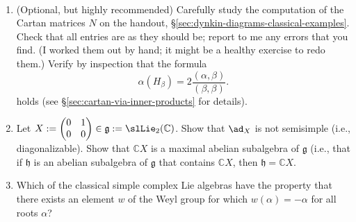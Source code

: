 \documentclass[reqno]{amsart} 
\begin{document}
\begin{homework}
~
  \begin{enumerate}
  \item
    (Optional, but highly recommended)
    Carefully study the computation of the Cartan
    matrices $N$ on the handout, \S\ref{sec:dynkin-diagrams-classical-examples}.
    Check that all entries are as they should be;
    report to me any errors that you find.
    (I worked them out by hand; it might be a healthy exercise
    to redo them.)
    Verify by inspection that the formula
    \begin{equation*}
    \alpha(H_\beta)
    = 2 \frac{(\alpha,\beta)}{(\beta,\beta)}.
    \end{equation*}
    holds (see \S\ref{sec:cartan-via-inner-products} for
    details).

  \item
    Let $X := 
\begin{pmatrix}
      0 & 1 \\
      0 & 0
    \end{pmatrix}
 \in \mathfrak{g} := \slLie_2(\mathbb{C})$.
    Show that $\ad_X$ is not semisimple (i.e., diagonalizable).
    Show that $\mathbb{C} X$ is a maximal abelian subalgebra
    of $\mathfrak{g}$ (i.e., that if $\mathfrak{h}$ is
    an abelian subalgebra of $\mathfrak{g}$ that contains
    $\mathbb{C} X$,
    then $\mathfrak{h} = \mathbb{C} X$.

  \item Which of the classical simple complex Lie algebras have
    the property that there exists an element $w$ of the Weyl
    group for which $w(\alpha) = -\alpha$ for all roots
    $\alpha$?


\end{enumerate}
\end{homework}
\end{document}
